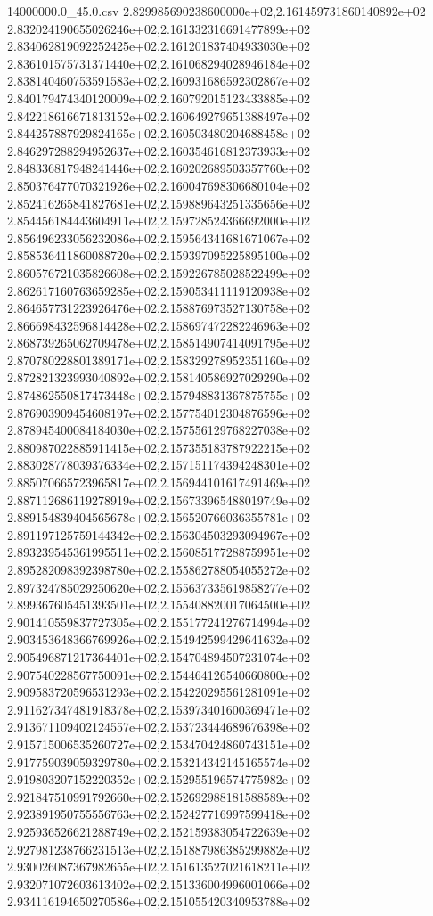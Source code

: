 \begin{filecontents*}{14000000.0_45.0.csv}
2.829985690238600000e+02,2.161459731860140892e+02
2.832024190655026246e+02,2.161332316691477899e+02
2.834062819092252425e+02,2.161201837404933030e+02
2.836101575731371440e+02,2.161068294028946184e+02
2.838140460753591583e+02,2.160931686592302867e+02
2.840179474340120009e+02,2.160792015123433885e+02
2.842218616671813152e+02,2.160649279651388497e+02
2.844257887929824165e+02,2.160503480204688458e+02
2.846297288294952637e+02,2.160354616812373933e+02
2.848336817948241446e+02,2.160202689503357760e+02
2.850376477070321926e+02,2.160047698306680104e+02
2.852416265841827681e+02,2.159889643251335656e+02
2.854456184443604911e+02,2.159728524366692000e+02
2.856496233056232086e+02,2.159564341681671067e+02
2.858536411860088720e+02,2.159397095225895100e+02
2.860576721035826608e+02,2.159226785028522499e+02
2.862617160763659285e+02,2.159053411119120938e+02
2.864657731223926476e+02,2.158876973527130758e+02
2.866698432596814428e+02,2.158697472282246963e+02
2.868739265062709478e+02,2.158514907414091795e+02
2.870780228801389171e+02,2.158329278952351160e+02
2.872821323993040892e+02,2.158140586927029290e+02
2.874862550817473448e+02,2.157948831367875755e+02
2.876903909454608197e+02,2.157754012304876596e+02
2.878945400084184030e+02,2.157556129768227038e+02
2.880987022885911415e+02,2.157355183787922215e+02
2.883028778039376334e+02,2.157151174394248301e+02
2.885070665723965817e+02,2.156944101617491469e+02
2.887112686119278919e+02,2.156733965488019749e+02
2.889154839404565678e+02,2.156520766036355781e+02
2.891197125759144342e+02,2.156304503293094967e+02
2.893239545361995511e+02,2.156085177288759951e+02
2.895282098392398780e+02,2.155862788054055272e+02
2.897324785029250620e+02,2.155637335619858277e+02
2.899367605451393501e+02,2.155408820017064500e+02
2.901410559837727305e+02,2.155177241276714994e+02
2.903453648366769926e+02,2.154942599429641632e+02
2.905496871217364401e+02,2.154704894507231074e+02
2.907540228567750091e+02,2.154464126540660800e+02
2.909583720596531293e+02,2.154220295561281091e+02
2.911627347481918378e+02,2.153973401600369471e+02
2.913671109402124557e+02,2.153723444689676398e+02
2.915715006535260727e+02,2.153470424860743151e+02
2.917759039059329780e+02,2.153214342145165574e+02
2.919803207152220352e+02,2.152955196574775982e+02
2.921847510991792660e+02,2.152692988181588589e+02
2.923891950755556763e+02,2.152427716997599418e+02
2.925936526621288749e+02,2.152159383054722639e+02
2.927981238766231513e+02,2.151887986385299882e+02
2.930026087367982655e+02,2.151613527021618211e+02
2.932071072603613402e+02,2.151336004996001066e+02
2.934116194650270586e+02,2.151055420340953788e+02

\end{filecontents*}
